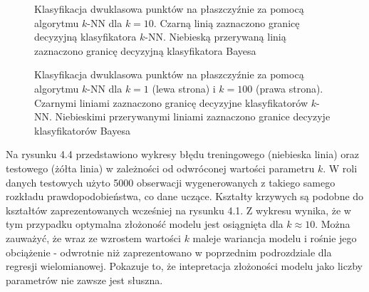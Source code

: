 \documentclass[notitlepage]{report}
\begin{document}
\begin{figure}[H]
	\centering
	\caption{Klasyfikacja dwuklasowa punktów na płaszczyźnie za pomocą algorytmu $k$-NN dla $k=10$. Czarną linią zaznaczono granicę decyzyjną klasyfikatora $k$-NN. Niebieską przerywaną linią zaznaczono granicę decyzyjną klasyfikatora Bayesa \cite{islr}}
\end{figure}

\begin{figure}[H]
	\centering
	\caption{Klasyfikacja dwuklasowa punktów na płaszczyźnie za pomocą algorytmu $k$-NN dla $k=1$ (lewa strona) i $k=100$ (prawa strona). Czarnymi liniami zaznaczono granicę decyzyjne klasyfikatorów $k$-NN. Niebieskimi przerywanymi liniami zaznaczono granice decyzyje klasyfikatorów Bayesa \cite{islr}}
\end{figure}

Na rysunku 4.4 przedstawiono wykresy błędu treningowego (niebieska linia) oraz testowego (żółta linia) w zależności od odwróconej wartości parametru $k$.  W roli danych testowych użyto 5000 obserwacji wygenerowanych z takiego samego rozkładu prawdopodobieństwa, co dane uczące. Kształty krzywych są podobne do kształtów zaprezentowanych wcześniej na rysunku 4.1. Z wykresu wynika, że w tym przypadku optymalna złożoność modelu jest osiągnięta dla $k \approx 10$. Można zauważyć, że wraz ze wzrostem wartości $k$ maleje wariancja modelu i rośnie jego obciążenie - odwrotnie niż zaprezentowano w poprzednim podrozdziale dla regresji wielomianowej. Pokazuje to, że intepretacja złożoności modelu jako liczby parametrów nie zawsze jest słuszna.
\end{document}
